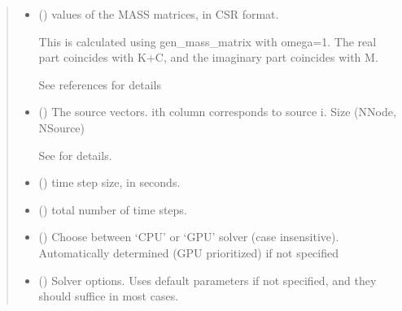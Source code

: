 \documentclass[letterpaper,10pt,english]{sphinxmanual}
\begin{document}
\begin{fulllineitems}
\begin{quote}
\begin{description}
\begin{itemize}
\item {} 
\sphinxAtStartPar
{} () \textendash{} 
\sphinxAtStartPar
values of the MASS matrices, in CSR format.

\sphinxAtStartPar
This is calculated using gen\_mass\_matrix with omega=1. The real part coincides with K+C, and the imaginary part coincides with \sphinxhyphen{}M.

\sphinxAtStartPar
See references for details


\item {} 
\sphinxAtStartPar
{} () \textendash{} 
\sphinxAtStartPar
The source vectors. i\sphinxhyphen{}th column corresponds to source i. Size (NNode, NSource)

\sphinxAtStartPar
See {\hyperref[\detokenize{_autosummary/nirfasterff.math.gen_sources:nirfasterff.math.gen_sources}]{}} for details.


\item {} 
\sphinxAtStartPar
{} () \textendash{} time step size, in seconds.

\item {} 
\sphinxAtStartPar
{} () \textendash{} total number of time steps.

\item {} 
\sphinxAtStartPar
{} (\sphinxstyleliteralemphasis{\sphinxupquote{, }}) \textendash{} Choose between ‘CPU’ or ‘GPU’ solver (case insensitive). Automatically determined (GPU prioritized) if not specified

\item {} 
\sphinxAtStartPar
{} ({\hyperref[\detokenize{_autosummary/nirfasterff.utils.SolverOptions:nirfasterff.utils.SolverOptions}]{}}\sphinxstyleliteralemphasis{\sphinxupquote{, }}) \textendash{} 
\sphinxAtStartPar
Solver options. Uses default parameters if not specified, and they should suffice in most cases.


\end{itemize}
\end{description}
\end{quote}
\end{fulllineitems}
\end{document}

